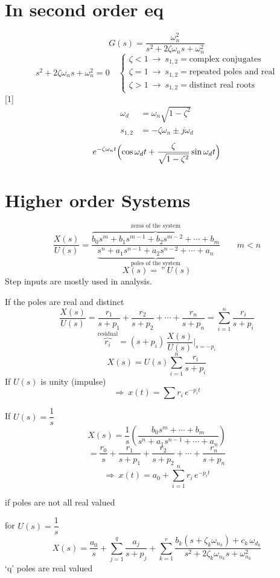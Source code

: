 \documentclass[11pt,a4paper]{article}
\begin{document}

\section{In second order eq}
\[ G(s)=\frac{\omega_n^2}{s^2+2\zeta\omega_n s+\omega_n^2} \]
\[ s^2+2\zeta\omega_n s+\omega_n^2=0\quad
\begin{cases}
\zeta<1\ \to\ s_{1,2}=\text{complex conjugates}\\
\zeta=1\ \to\ s_{1,2}=\text{repeated poles and real}\\
\zeta>1\ \to\ s_{1,2}=\text{distinct real roots}
\end{cases} \]
[1]
\begin{align*}
\omega_d&=\omega_n\sqrt{1-\zeta^2}\\
s_{1,2}&=-\zeta\omega_n\pm j\omega_d
\end{align*}
\[ e^{-\zeta\omega_n t}\Bigl(\cos\omega_d t+\frac{\zeta}{\sqrt{1-\zeta^2}}\sin\omega_d t\Bigr) \]

\section{Higher order Systems}
\[ \frac{X(s)}{U(s)}=\frac{\overbrace{b_0 s^m+b_1 s^{m-1}+b_2 s^{m-2}+\cdots+b_m}^{\text{zeros of the system}}}{\underbrace{s^n+a_1 s^{n-1}+a_2 s^{n-2}+\cdots+a_n}_{\text{poles of the system}}}\qquad m<n \]
\[ X(s)=\ \text{''}\ U(s) \]
Step inputs are mostly used in analysis.

If the poles are real and distinct
\[ \frac{X(s)}{U(s)}=\frac{r_1}{s+p_1}+\frac{r_2}{s+p_2}+\cdots+\frac{r_n}{s+p_n}=\sum_{i=1}^{n}\frac{r_i}{s+p_i} \]
\[ \overbrace{r_i}^{\text{residual}}=(s+p_i)\,\frac{X(s)}{U(s)}\Bigg|_{s=-p_i} \]
\[ X(s)=U(s)\sum_{i=1}^{n}\frac{r_i}{s+p_i} \]
If $U(s)$ is unity (impulse)
\[ \Rightarrow\ x(t)=\sum r_i\,e^{-p_i t} \]

If $U(s)=\dfrac{1}{s}$
\[ X(s)=\frac{1}{s}\left(\frac{b_0 s^m+\cdots+b_m}{s^n+a_1 s^{n-1}+\cdots+a_n}\right) \]
\[ =\frac{r_0}{s}+\frac{r_1}{s+p_1}+\frac{r_2}{s+p_2}+\cdots+\frac{r_n}{s+p_n} \]
\[ \Rightarrow\ x(t)=a_0+\sum_{i=1}^{n} r_i\,e^{-p_i t} \]

if poles are not all real valued

for $U(s)=\dfrac{1}{s}$
\[ X(s)=\frac{a_0}{s}+\sum_{j=1}^{q}\frac{a_j}{s+p_j}+\sum_{k=1}^{r}\frac{b_k(s+\zeta_k\omega_{n_k})+c_k\,\omega_{d_k}}{s^2+2\zeta_k\omega_{n_k}s+\omega_{n_k}^2} \]
`q' poles are real valued
\end{document}
